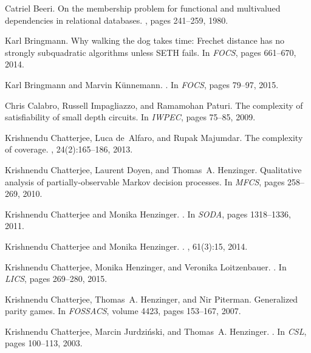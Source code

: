 \documentclass[11pt,letterpaper]{article}
\begin{document}
\begin{thebibliography}{10}
Catriel Beeri.
\newblock On the membership problem for functional and multivalued dependencies
  in relational databases.
, pages 241--259, 1980.

Karl Bringmann.
\newblock Why walking the dog takes time: Frechet distance has no strongly
  subquadratic algorithms unless {SETH} fails.
\newblock In {\em {FOCS}}, pages 661--670, 2014.

Karl Bringmann and Marvin Künnemann.
.
\newblock In {\em FOCS}, pages 79--97, 2015.

Chris Calabro, Russell Impagliazzo, and Ramamohan Paturi.
\newblock The complexity of satisfiability of small depth circuits.
\newblock In {\em {IWPEC}}, pages 75--85, 2009.

Krishnendu Chatterjee, Luca de~Alfaro, and Rupak Majumdar.
\newblock The complexity of coverage.
, 24(2):165--186, 2013.

Krishnendu Chatterjee, Laurent Doyen, and Thomas~A. Henzinger.
\newblock Qualitative analysis of partially-observable {M}arkov decision
  processes.
\newblock In {\em {MFCS}}, pages 258--269, 2010.

Krishnendu Chatterjee and Monika Henzinger.
.
\newblock In {\em SODA}, pages 1318--1336, 2011.

Krishnendu Chatterjee and Monika Henzinger.
.
, 61(3):15, 2014.

Krishnendu Chatterjee, Monika Henzinger, and Veronika Loitzenbauer.
.
\newblock In {\em LICS}, pages 269--280, 2015.

Krishnendu Chatterjee, Thomas~A. Henzinger, and Nir Piterman.
\newblock Generalized parity games.
\newblock In {\em FOSSACS}, volume 4423, pages 153--167, 2007.

Krishnendu Chatterjee, Marcin Jurdziński, and Thomas~A. Henzinger.
.
\newblock In {\em CSL}, pages 100--113, 2003.


\end{thebibliography}
\end{document}
